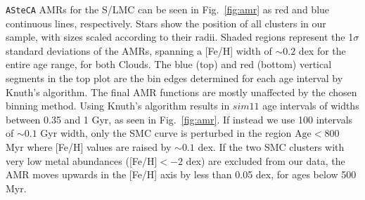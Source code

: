 \documentclass{aa}
\begin{document}
\texttt{ASteCA} AMRs for the S/LMC can be seen in Fig.~\ref{fig:amr} as red and
blue continuous lines, respectively. Stars show the position of all clusters in
our sample, with sizes scaled according to their radii.
%
Shaded regions represent the 1$\sigma$ standard deviations of the AMRs, spanning
a [Fe/H] width of ${\sim}0.2$ dex for the entire age range, for both Clouds.
The blue (top) and red (bottom) vertical segments in the top plot are the bin
edges determined for each age interval by Knuth's algorithm.
%
The final AMR functions are mostly unaffected by the chosen binning method.
Using Knuth's algorithm results in ${sim}11$ age intervals of widths between
0.35 and 1 Gyr, as seen in Fig.~\ref{fig:amr}. If instead we use 100 intervals
of ${\sim}0.1$ Gyr width, only the SMC curve is perturbed in the region
$\mathrm{Age}{<800}$ Myr where [Fe/H] values are raised by ${\sim}0.1$ dex.
%
%
If the two SMC clusters with very low metal abundances ([Fe/H]${<-}2$ dex) are
excluded from our data, the AMR moves upwards in the [Fe/H] axis by less than
0.05 dex, for ages below 500 Myr.
\end{document}
